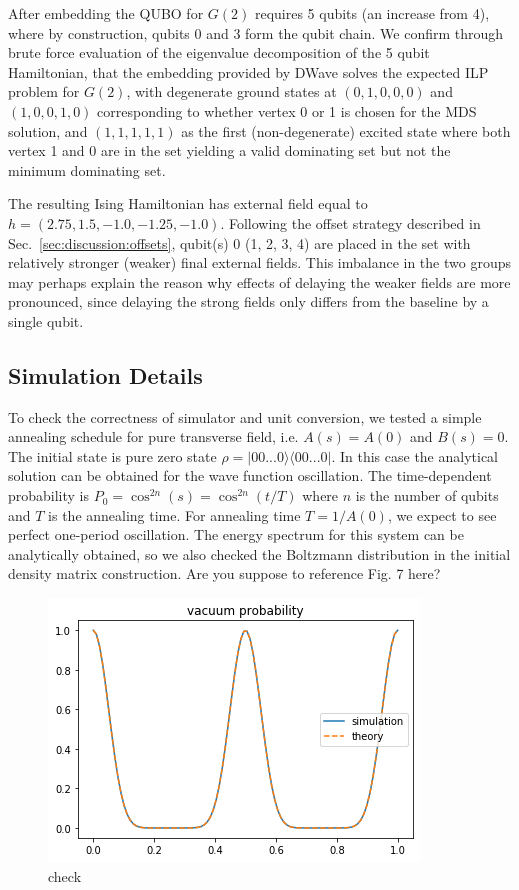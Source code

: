 \documentclass[prd,twocolumn,tightenlines,preprintnumbers,showpacs,superscriptaddress,notitlepage,nofootinbib,eqsecnum,
floatfix,longbibliography,aps,10pt]{revtex4-2}
\begin{document}
After embedding the QUBO for $G(2)$ requires 5 qubits (an increase from 4), where by construction, qubits 0 and 3 form the qubit chain. We confirm through brute force evaluation of the eigenvalue decomposition of the 5 qubit Hamiltonian, that the embedding provided by DWave solves the expected ILP problem for $G(2)$, with degenerate ground states at $(0, 1, 0, 0, 0)$ and $(1, 0, 0, 1, 0)$ corresponding to whether vertex 0 or 1 is chosen for the MDS solution, and $(1, 1, 1, 1, 1)$ as the first (non-degenerate) excited state where both vertex 1 and 0 are in the set yielding a valid dominating set but not the minimum dominating set.

The resulting Ising Hamiltonian has external field equal to $h = (2.75, 1.5, -1.0, -1.25, -1.0)$. Following the offset strategy described in Sec.~\ref{sec:discussion:offsets}, qubit(s) 0 (1, 2, 3, 4) are placed in the set with relatively stronger (weaker) final external fields. This imbalance in the two groups may perhaps explain the reason why effects of delaying the weaker fields are more pronounced, since delaying the strong fields only differs from the baseline by a single qubit.

\subsection{Simulation Details}
\label{sec:methods:simulation_details}
To check the correctness of simulator and unit conversion, we tested a simple annealing schedule for pure transverse field, i.e. $A(s)=A(0)$ and $B(s)=0$. The initial state is pure zero state $\rho=|00...0\rangle \langle 00...0|$. In this case the analytical solution can be obtained for the wave function oscillation. The time-dependent probability is $P_{0}=\cos^{2n}(s)=\cos^{2n}(t/T)$ where $n$ is the number of qubits and $T$ is the annealing time. For annealing time $T=1/A(0)$, we expect to see perfect one-period oscillation. The energy spectrum for this system can be analytically obtained, so we also checked the Boltzmann distribution in the initial density matrix construction. {\color{red} Are you suppose to reference Fig. 7 here?}

\begin{figure}
	\centering
	\includegraphics[width=\columnwidth]{./figures/check.png}
	\caption{check}
	\label{fig:check}
\end{figure}
\end{document}
